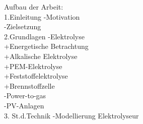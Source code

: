 \documentclass{article}
\begin{document}
Aufbau der Arbeit:\\
1.Einleitung 	-Motivation\\
				-Zielsetzung\\
2.Grundlagen 	-Elektrolyse\\
					+Energetische Betrachtung\\
					+Alkalische Elektrolyse\\
					+PEM-Elektrolyse\\
					+Feststoffelektrolyse\\
					+Brennstoffzelle\\
				-Power-to-gas\\	
				-PV-Anlagen\\
3. St.d.Technik	-Modellierung Elektrolyseur
					
\end{document}
